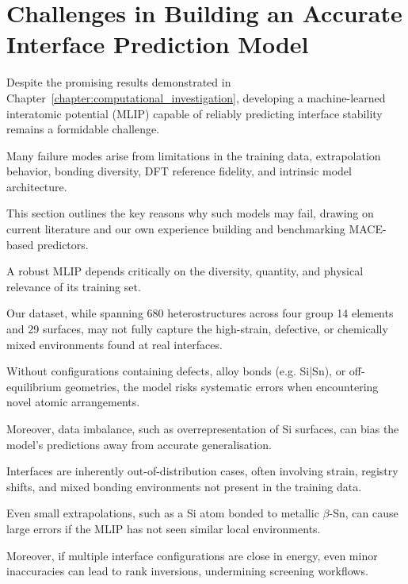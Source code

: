 \section{Challenges in Building an Accurate Interface Prediction Model}\label{section:model_challenges}


Despite the promising results demonstrated in Chapter~\ref{chapter:computational_investigation}, developing a
machine-learned interatomic potential (MLIP) capable of reliably predicting interface stability remains a formidable
challenge.

Many failure modes arise from limitations in the training data, extrapolation behavior, bonding diversity, DFT reference
fidelity, and intrinsic model architecture.

This section outlines the key reasons why such models may fail, drawing on current literature and our own experience
building and benchmarking MACE-based predictors.


A robust MLIP depends critically on the diversity, quantity, and physical relevance of its training set.

Our dataset, while spanning 680 heterostructures across four group 14 elements and 29 surfaces, may not fully capture
the high-strain, defective, or chemically mixed environments found at real interfaces.

Without configurations containing defects, alloy bonds (e.g. Si|Sn), or off-equilibrium geometries, the model risks
systematic errors when encountering novel atomic arrangements.

Moreover, data imbalance, such as overrepresentation of Si surfaces, can bias the model's predictions away from accurate
generalisation.


Interfaces are inherently out-of-distribution cases, often involving strain, registry shifts, and mixed bonding
environments not present in the training data.

Even small extrapolations, such as a Si atom bonded to metallic \(\beta\)-Sn, can cause large errors if the MLIP has not
seen similar local environments.

Moreover, if multiple interface configurations are close in energy, even minor inaccuracies can lead to rank inversions,
undermining screening workflows.


